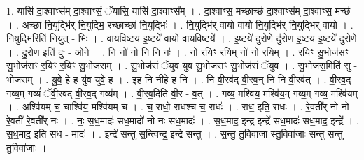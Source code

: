 \documentclass[17pt]{extarticle}
\begin{document}
1. यासि॑ दा॒श्वाꣳस॑म् दा॒श्वाꣳसं॒ ॅयासि॒ यासि॑ दा॒श्वाꣳस᳚म् । . दा॒श्वाꣳस॒ मच्छाच्छ॑ दा॒श्वाꣳस॑म् दा॒श्वाꣳस॒ मच्छ॑ । . अच्छा॑ नि॒युद्भि॑र् नि॒युद्भि॒ रच्छाच्छा॑ नि॒युद्भिः॑ । . नि॒युद्भि॑र् वायो वायो नि॒युद्भि॑र् नि॒युद्भि॑र् वायो । . नि॒युद्भि॒रिति॑ नि॒युत् - भिः॒ । . वा॒यवि॒ष्टय॑ इ॒ष्टये॑ वायो वा॒यवि॒ष्टये᳚ । . इ॒ष्टये॑ दुरो॒णे दु॑रो॒ण इ॒ष्टय॑ इ॒ष्टये॑ दुरो॒णे । . दु॒रो॒ण इति॑ दुः - ओ॒ने । . नि नो॑ नो॒ नि नि नः॑ । . नो॒ र॒यिꣳ र॒यिम् नो॑ नो र॒यिम् । . र॒यिꣳ सु॒भोज॑सꣳ सु॒भोज॑सꣳ र॒यिꣳ र॒यिꣳ सु॒भोज॑सम् । . सु॒भोज॑सं ॅयुव युव सु॒भोज॑सꣳ सु॒भोज॑सं ॅयुव । . सु॒भोज॑स॒मिति॑ सु - भोज॑सम् । . यु॒वे॒ हे ह यु॑व युवे॒ ह । . इ॒ह नि नीहे ह नि । . नि वी॒रव॑द् वी॒रव॒न् नि नि वी॒रव॑त् । . वी॒रव॒द् गव्य॒म् गव्यं॑ ॅवी॒रव॑द् वी॒रव॒द् गव्य᳚म् । . वी॒रव॒दिति॑ वी॒र - व॒त् । . गव्य॒ मश्वि॑य॒ मश्वि॑य॒म् गव्य॒म् गव्य॒ मश्वि॑यम् । . अश्वि॑यम् च॒ चाश्वि॑य॒ मश्वि॑यम् च । . च॒ राधो॒ राध॑श्च च॒ राधः॑ । . राध॒ इति॒ राधः॑ । . रे॒वती᳚र् नो नो रे॒वती॑ रे॒वती᳚र् नः । . नः॒ स॒ध॒मादः॑ सध॒मादो॑ नो नः सध॒मादः॑ । . स॒ध॒माद॒ इन्द्र॒ इन्द्रे॑ सध॒मादः॑ सध॒माद॒ इन्द्रे᳚ । . स॒ध॒माद॒ इति॑ सध - मादः॑ । . इन्द्रे॑ सन्तु स॒न्त्विन्द्र॒ इन्द्रे॑ सन्तु । . स॒न्तु॒ तु॒विवा॑जा स्तु॒विवा॑जाः सन्तु सन्तु तु॒विवा॑जाः । \newline
\end{document}
